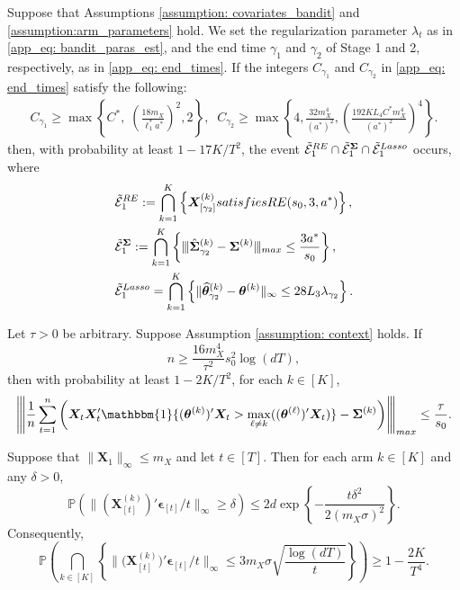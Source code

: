 \documentclass[10pt,a4paper]{amsart}
\newcommand{\Pro}{\mathbb{P}}
\newcommand{\bSigma}{\boldsymbol{\Sigma}}
\newcommand{\bX}{\boldsymbol{X}}
\newcommand{\bd}[1]{\boldsymbol{#1}}
\newcommand{\bepsilon}{\bd{\epsilon}}
\newcommand{\btheta}{\boldsymbol{\theta}}
\newcommand{\hbSigma}{\hat{\boldsymbol{\Sigma}}}
\newcommand{\hbtheta}{\widehat{\boldsymbol{\theta}}}
\newcommand{\idf}{\mathbbm{1}}
\newcommand{\mE}{\mathcal{E}}
\newcommand{\mn}{\vert\kern-0.25ex \vert\kern-0.25ex \vert}
\newcommand{\op}[1]{{\left\vert\kern-0.25ex\left\vert\kern-0.25ex\left\vert #1\right\vert\kern-0.25ex\right\vert\kern-0.25ex\right\vert}}
\begin{document}
\begin{lemma}  \label{stage3: base case}
Suppose that Assumptions \ref{assumption: covariates_bandit} and \ref{assumption:arm_parameters} hold. We set the regularization parameter $\lambda_t$ as in \eqref{app_eq: bandit_paras_est}, and the end time $\gamma_1$ and $\gamma_2$ of Stage 1 and 2, respectively, as in \eqref{app_eq: end_times}.
If the integers $C_{\gamma_1}$ and $C_{\gamma_2}$ in \eqref{app_eq: end_times} satisfy the following:
\begin{align}
    \label{eq: aux_lambda_gamma_12}
     C_{\gamma_1} \ge \max\left\{C^*,\; \left(\frac{18m_X}{\ell_1^* a^*}\right)^2,2\right\}, \;\;
     C_{\gamma_2} \ge \max\left\{4, \frac{32 m_{X}^4}{(a^*)^2}, \left(\frac{192K L_4 C^* m_X^4}{(a^*)^2} \right)^4 \right\}.
\end{align}
then, with probability at least $1-17K/T^2$, the event $\tilde{\mE}_1^{\textup{RE}} \cap \tilde{\mE}_1^{\bSigma} \cap  \tilde{\mE}_1^{\textup{Lasso}}$ occurs, where
\begin{align*}
\begin{split}
&\tilde{\mE}_1^{\textup{RE}} := \bigcap_{k=1}^{K}\left\{\bX_{[\gamma_2]}^{(k)} \textup{ satisfies } \textup{RE}(s_0, 3, a^*)\right\},\\ 
&\tilde{\mE}_1^{\bSigma} := \bigcap_{k=1}^{K}\left\{\mn\hbSigma_{\gamma_2}^{(k)}-\bSigma^{(k)}\mn_{\textup{max}} \le  \frac{3 a^*}{s_0} \right\},\\ 
&\tilde{\mE}_1^{\textup{Lasso}} = \bigcap_{k = 1}^{K}\left\{\|\hbtheta_{\gamma_2}^{(k)} - \btheta^{(k)}\|_{\infty} \leq  28L_3 \lambda_{\gamma_2}\right\}.
\end{split}
\end{align*}
\end{lemma}

\begin{lemma}\label{lemma: event D_2}
Let $\tau > 0$ be arbitrary. Suppose  Assumption \ref{assumption: context} holds. If 
$$n \geq \frac{16m_X^4}{\tau^2} s_0^2 \log(dT),$$ 
then with probability at least $1-2K/T^2$, for each $k \in [K]$, 
$$\op{\frac{1}{n}\sum_{t=1}^{n} \left(\bX_t\bX_t'\idf\{(\btheta^{(k)})'\bX_t>\max_{\ell \neq k}((\btheta^{(\ell)})'\bX_t)\}-\bSigma^{(k)}\right) }_{\textup{max}} \le \frac{\tau}{s_0}.$$
\end{lemma}

\begin{lemma} \label{lemma:ell_infty bound of x times epsilon}
Suppose that $\|\bX_1\|_{\infty}\le m_X$ and let $t \in [T]$. Then for each arm $k\in[K]$ and any $\delta > 0$,
$$\Pro\left(\|({\bX_{[t]}^{(k)}})' \bepsilon_{[t]}/t\|_{\infty} \ge \delta \right) \le 2d\exp\left\{-\frac{t\delta^2}{2(m_X\sigma)^2} \right\}.$$
Consequently,
\begin{equation*}
    \Pro\left(\bigcap_{k\in [K]}\left\{\|{(\bX_{[t]}^{(k)}})' \bepsilon_{[t]}/t\|_{\infty} 
    \le 3m_X\sigma\sqrt{\frac{\log (dT)}{t}} \right\} \right) \ge 1-\frac{2K}{T^4}.
\end{equation*}
\end{lemma}
\end{document}
